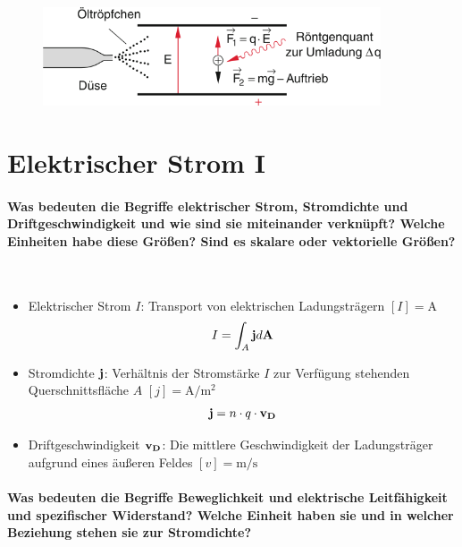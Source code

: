 \documentclass[a4paper, 11pt, ngerman, parskip=half-]{scrartcl}
\begin{document}
\begin{figure}[H]
    \centering
    \includegraphics[width=10cm]{image/02/10}
\end{figure}

\newpage

\section{Elektrischer Strom I}

\paragraph{Was bedeuten die Begriffe elektrischer Strom, Stromdichte und Driftgeschwindigkeit und
    wie sind sie miteinander verknüpft? Welche Einheiten habe diese Größen? Sind es skalare oder
    vektorielle Größen?} ~

\begin{itemize}
    \item Elektrischer Strom $I$: Transport von elektrischen Ladungsträgern $[I] = \si{\A}$
          \begin{equation}
              I = \int_A \bold{j} d\bold{A}
          \end{equation}

    \item Stromdichte $\bold{j}$: Verhältnis der Stromstärke $I$ zur Verfügung stehenden
          Querschnittsfläche $A$ $[j] = \si{\A\per\m^2}$
          \begin{equation}
              \bold{j} = n \cdot q \cdot \bold{v_D}
          \end{equation}

    \item Driftgeschwindigkeit $\bold{v_D}$: Die mittlere Geschwindigkeit der Ladungsträger aufgrund
          eines äußeren Feldes $[v] = \si{\m\per\s}$
\end{itemize}

\paragraph{Was bedeuten die Begriffe Beweglichkeit und elektrische Leitfähigkeit und spezifischer
    Widerstand? Welche Einheit haben sie und in welcher Beziehung stehen sie zur Stromdichte?} ~
\end{document}
